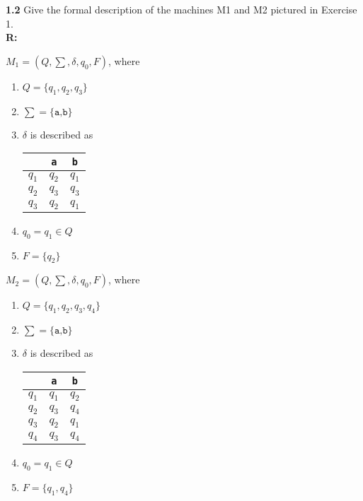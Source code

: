 \documentclass{article}
\begin{document}
\pagebreak
\textbf{1.2} Give the formal description of the machines M1 and M2 pictured in
Exercise 1. \\
\textbf{R: } 
\begin{center}
    $M_1 = ( Q, \sum, \delta, q_0, F)$, where 
\end{center}

\begin{enumerate}
    \item $Q = \{q_1, q_2, q_3\}$
    \item $\sum = \{\texttt{a,b}\}$
    \item $\delta$ is described as
    \begin{center}
        \begin{tabular}{c|cc}
            &   \texttt{a}     &   \texttt{b} \\
            \hline
            $q_1$   &   $q_2$   &   $q_1$   \\
            $q_2$   &   $q_3$   &   $q_3$   \\
            $q_3$   &   $q_2$   &   $q_1$
        \end{tabular}
    \end{center}
    \item $q_0 = q_1 \in Q$
    \item $F = \{q_2\}$
\end{enumerate}

\begin{center}
    $M_2 = ( Q, \sum, \delta, q_0, F)$, where 
\end{center}

\begin{enumerate}
    \item $Q = \{q_1, q_2, q_3, q_4\}$
    \item $\sum = \{\texttt{a,b}\}$
    \item $\delta$ is described as
    \begin{center}
        \begin{tabular}{c|cc}
            &   \texttt{a}     &   \texttt{b} \\
            \hline
            $q_1$   &   $q_1$   &   $q_2$   \\
            $q_2$   &   $q_3$   &   $q_4$   \\
            $q_3$   &   $q_2$   &   $q_1$   \\
            $q_4$   &   $q_3$   &   $q_4$
        \end{tabular}
    \end{center}
    \item $q_0 = q_1 \in Q$
    \item $F = \{q_1, q_4\}$
\end{enumerate}
\end{document}
